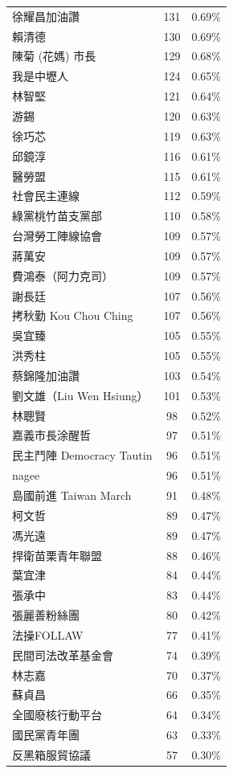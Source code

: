\documentclass[a4paper, 10pt, conference]{ieeeconf}       %
\begin{document}
\begin{CJK}{UTF8}{bsmi}
\begin{longtable}[c]{@{}lcc@{}}
徐耀昌加油讚 & 131 & 0.69\% \\
賴清德 & 130 & 0.69\% \\
陳菊 (花媽) 市長 & 129 & 0.68\% \\
我是中壢人 & 124 & 0.65\% \\
林智堅 & 121 & 0.64\% \\
游錫\charkun{} & 120 & 0.63\% \\
徐巧芯 & 119 & 0.63\% \\
邱鏡淳 & 116 & 0.61\% \\
醫勞盟 & 115 & 0.61\% \\
社會民主連線 & 112 & 0.59\% \\
綠黨桃竹苗支黨部 & 110 & 0.58\% \\
台灣勞工陣線協會 & 109 & 0.57\% \\
蔣萬安 & 109 & 0.57\% \\
費鴻泰（阿力克司） & 109 & 0.57\% \\
謝長廷 & 107 & 0.56\% \\
拷秋勤 Kou Chou Ching & 107 & 0.56\% \\
吳宜臻 & 105 & 0.55\% \\
洪秀柱 & 105 & 0.55\% \\
蔡錦隆加油讚 & 103 & 0.54\% \\
劉文雄（Liu Wen Hsiung） & 101 & 0.53\% \\
林聰賢 & 98 & 0.52\% \\
嘉義市長涂醒哲 & 97 & 0.51\% \\
民主鬥陣 Democracy Tautin & 96 & 0.51\% \\
nagee & 96 & 0.51\% \\
島國前進 Taiwan March & 91 & 0.48\% \\
柯文哲 & 89 & 0.47\% \\
馮光遠 & 89 & 0.47\% \\
捍衛苗栗青年聯盟 & 88 & 0.46\% \\
葉宜津 & 84 & 0.44\% \\
張承中 & 83 & 0.44\% \\
張麗善粉絲團 & 80 & 0.42\% \\
法操FOLLAW & 77 & 0.41\% \\
民間司法改革基金會 & 74 & 0.39\% \\
林志嘉 & 70 & 0.37\% \\
蘇貞昌 & 66 & 0.35\% \\
全國廢核行動平台 & 64 & 0.34\% \\
國民黨青年團 & 63 & 0.33\% \\
反黑箱服貿協議 & 57 & 0.30\% \\

\end{longtable}
\end{CJK}
\end{document}
